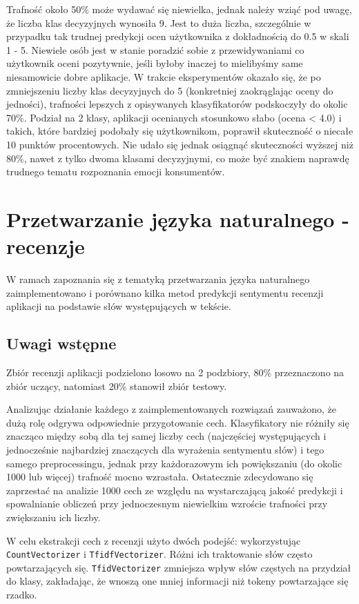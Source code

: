 \documentclass{article}
\begin{document}
Trafność około 50\% może wydawać się niewielka, jednak należy wziąć pod uwagę, że liczba klas decyzyjnych wynosiła 9. Jest to duża liczba, szczególnie w przypadku tak trudnej predykcji ocen użytkownika z dokładnością do 0.5 w skali 1 - 5. Niewiele osób jest w stanie poradzić sobie z przewidywaniami co użytkownik oceni pozytywnie, jeśli byłoby inaczej to mielibyśmy same niesamowicie dobre aplikacje. W trakcie eksperymentów okazało się, że po zmniejszeniu liczby klas decyzyjnych do 5 (konkretniej zaokrąglając oceny do jedności), trafności lepszych z opisywanych klasyfikatorów podskoczyły do okolic 70\%. Podział na 2 klasy, aplikacji ocenianych stosunkowo słabo (ocena < 4.0) i takich, które bardziej podobały się użytkownikom, poprawił skuteczność o niecałe 10 punktów procentowych. Nie udało się jednak osiągnąć skuteczności wyższej niż 80\%, nawet z tylko dwoma klasami decyzyjnymi, co może być znakiem naprawdę trudnego tematu rozpoznania emocji konsumentów.

\section{Przetwarzanie języka naturalnego - recenzje}
W ramach zapoznania się z tematyką przetwarzania języka naturalnego zaimplementowano i porównano kilka metod predykcji sentymentu recenzji aplikacji na podstawie słów występujących w tekście.

\subsection{Uwagi wstępne}
Zbiór recenzji aplikacji podzielono losowo na 2 podzbiory, 80\% przeznaczono na zbiór uczący, natomiast 20\% stanowił zbiór testowy.

Analizując działanie każdego z zaimplementowanych rozwiązań zauważono, że dużą rolę odgrywa odpowiednie przygotowanie cech. Klasyfikatory nie różniły się znacząco między sobą dla tej samej liczby cech (najczęściej występujących i jednocześnie najbardziej znaczących dla wyrażenia sentymentu słów) i tego samego preprocessingu, jednak przy każdorazowym ich powiększaniu (do okolic 1000 lub więcej) trafność mocno wzrastała. Ostatecznie zdecydowano się zaprzestać na analizie 1000 cech ze względu na wystarczającą jakość predykcji i spowalnianie obliczeń przy jednoczesnym niewielkim wzroście trafności przy zwiększaniu ich liczby.

W celu ekstrakcji cech z recenzji użyto dwóch podejść: wykorzystując \texttt{CountVectorizer} i \texttt{TfidfVectorizer}. Różni ich traktowanie słów często powtarzających się. \texttt{TfidVectorizer} zmniejsza wpływ słów częstych na przydział do klasy, zakładając, że wnoszą one mniej informacji niż tokeny powtarzające się rzadko.
\end{document}
